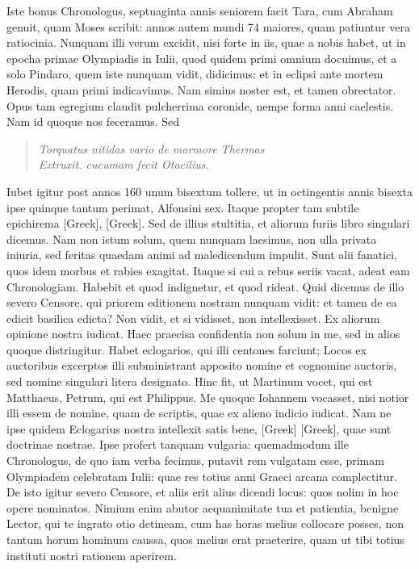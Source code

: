 Iste bonus
Chronologus, septuaginta annis seniorem facit Tara, cum Abraham
genuit, quam Moses scribit: annos autem mundi 74 maiores,
quam patiuntur vera ratiocinia.
Nunquam illi verum excidit, nisi
forte in iis, quae a nobis habet, ut in epocha primae Olympiadis in
 Iulii, quod quidem primi omnium docuimus, et a solo
Pindaro, quem iste nunquam vidit, didicimus: et in eclipsi ante
mortem Herodis, quam primi indicavimus.
Nam simius noster est,
et tamen obrectator.
Opus tam egregium claudit pulcherrima
coronide, nempe forma anni caelestis.
Nam id quoque nos feceramus.
Sed
\begin{quote}
\textit{Torquatus nitidas vario de marmore Thermas}\\
	\textit{Extruxit. cucumam fecit Otacilius.}
\end{quote}
Iubet igitur post annos 160 unum bisextum tollere, ut in octingentis
annis bisexta ipse quinque tantum perimat, Alfonsini sex.
Itaque propter tam subtile epichirema \textgreek{[Greek]},
 \textgreek{[Greek]}.
Sed de illius stultitia, et aliorum furiis libro singulari dicemus.
Nam non istum solum, quem nunquam laesimus, non ulla privata iniuria,
sed feritas quaedam animi ad maledicendum impulit.
Sunt alii
fanatici, quos idem morbus et rabies exagitat.
Itaque si cui a rebus
seriis vacat, adeat eam Chronologiam.
Habebit et quod indignetur,
et quod rideat.
Quid dicemus de illo severo Censore, qui priorem
editionem nostram nunquam vidit: et tamen de ea edicit basilica
edicta?
Non vidit, et si vidisset, non intellexisset.
Ex aliorum opinione
nostra iudicat.
Haec praecisa confidentia non solum in me,
sed in alios quoque distringitur.
Habet eclogarios, qui illi centones
farciunt;
Locos ex auctoribus excerptos illi subministrant apposito
nomine et cognomine auctoris, sed nomine singulari litera designato.
Hinc fit, ut Martinum vocet, qui est Matthaeus, Petrum, qui est
Philippus.
Me quoque Iohannem vocasset, nisi notior illi essem de
nomine, quam de scriptis, quae ex alieno indicio iudicat.
Nam
ne ipse quidem Eclogarius nostra intellexit satis bene, \textgreek{[Greek]}
\textgreek{[Greek]}, quae sunt doctrinae nostrae.
Ipse profert tanquam vulgaria: quemadmodum ille Chronologus, de quo iam
verba fecimus, putavit rem vulgatam esse, primam Olympiadem
celebratam  Iulii:
 quae res totius anni Graeci arcana complectitur.
De isto igitur severo Censore, et aliis erit alius dicendi locus:
quos nolim in hoc opere nominatos.
Nimium enim abutor aequanimitate
tua et patientia, benigne Lector, qui te ingrato otio detineam,
cum has horas melius collocare posses, non tantum horum
hominum caussa, quos melius erat praeterire, quam ut tibi totius instituti
nostri rationem aperirem.

